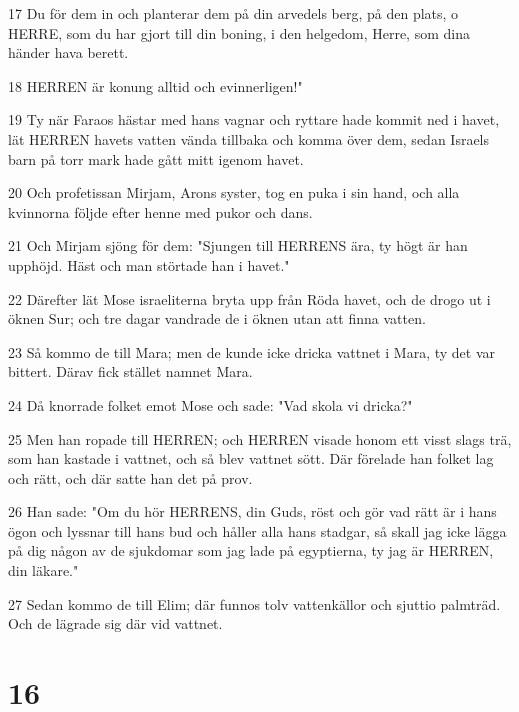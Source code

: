 \par 17 Du för dem in och planterar dem på din arvedels berg, på den plats, o HERRE, som du har gjort till din boning, i den helgedom, Herre, som dina händer hava berett.
\par 18 HERREN är konung alltid och evinnerligen!"
\par 19 Ty när Faraos hästar med hans vagnar och ryttare hade kommit ned i havet, lät HERREN havets vatten vända tillbaka och komma över dem, sedan Israels barn på torr mark hade gått mitt igenom havet.
\par 20 Och profetissan Mirjam, Arons syster, tog en puka i sin hand, och alla kvinnorna följde efter henne med pukor och dans.
\par 21 Och Mirjam sjöng för dem: "Sjungen till HERRENS ära, ty högt är han upphöjd. Häst och man störtade han i havet."
\par 22 Därefter lät Mose israeliterna bryta upp från Röda havet, och de drogo ut i öknen Sur; och tre dagar vandrade de i öknen utan att finna vatten.
\par 23 Så kommo de till Mara; men de kunde icke dricka vattnet i Mara, ty det var bittert. Därav fick stället namnet Mara.
\par 24 Då knorrade folket emot Mose och sade: "Vad skola vi dricka?"
\par 25 Men han ropade till HERREN; och HERREN visade honom ett visst slags trä, som han kastade i vattnet, och så blev vattnet sött. Där förelade han folket lag och rätt, och där satte han det på prov.
\par 26 Han sade: "Om du hör HERRENS, din Guds, röst och gör vad rätt är i hans ögon och lyssnar till hans bud och håller alla hans stadgar, så skall jag icke lägga på dig någon av de sjukdomar som jag lade på egyptierna, ty jag är HERREN, din läkare."
\par 27 Sedan kommo de till Elim; där funnos tolv vattenkällor och sjuttio palmträd. Och de lägrade sig där vid vattnet.

\chapter{16}

